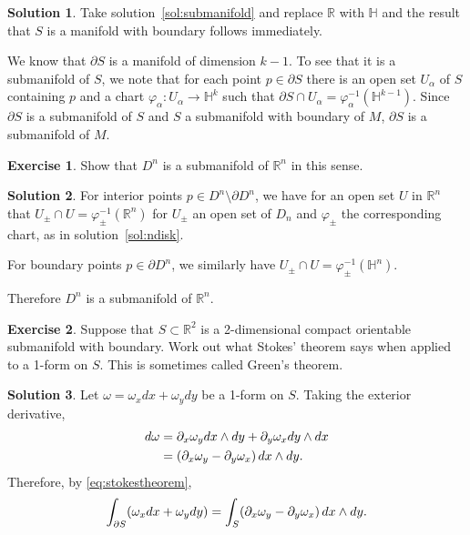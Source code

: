 \documentclass[11pt, a4paper]{report}
\theoremstyle{definition}
\newtheorem{exercise}{Exercise}[part]
\newtheorem{solution}{Solution}[part]
\newenvironment{ex}{\begin{exercise}}{\end{exercise}\pagebreak[1]}
\newenvironment{sol}{\begin{solution}}{\end{solution}\pagebreak[3]}
\newcommand*{\op}[1]{\ensuremath\mathop{}\mathopen{}#1}
\renewcommand*{\d}{\op{d}}
\begin{document}
\begin{sol}

Take solution~\ref{sol:submanifold} and replace $\mathbb{R}$ with $\mathbb{H}$ and the result that $S$ is a manifold with boundary follows immediately.

We know that $\partial S$ is a manifold of dimension $k - 1$. To see that it is a submanifold of $S$, we note that for each point $p \in \partial S$ there is an open set $U_\alpha$ of $S$ containing $p$ and a chart $\varphi_\alpha: U_\alpha \to \mathbb{H}^k$ such that $\partial S \cap U_\alpha = \varphi_\alpha^{-1}(\mathbb{H}^{k - 1})$. Since $\partial S$ is a submanifold of $S$ and $S$ a submanifold with boundary of $M$, $\partial S$ is a submanifold of $M$.

\end{sol}

\begin{ex}

Show that $D^n$ is a submanifold of $\mathbb{R}^n$ in this sense.

\end{ex}

\begin{sol}

For interior points $p \in D^n \setminus \partial D^n$, we have for an open set $U$ in $\mathbb{R}^n$ that $U_\pm \cap U = \varphi_\pm^{-1}(\mathbb{R}^n)$ for $U_\pm$ an open set of $D_n$ and $\varphi_\pm$ the corresponding chart, as in solution~\ref{sol:ndisk}.

For boundary points $p \in \partial D^n$, we similarly have $U_\pm \cap U = \varphi_\pm^{-1}(\mathbb{H}^n)$.

Therefore $D^n$ is a submanifold of $\mathbb{R}^n$.

\end{sol}

\begin{ex}

Suppose that $S \subset \mathbb{R}^2$ is a 2-dimensional compact orientable submanifold with boundary.
Work out what Stokes' theorem says when applied to a 1-form on $S$.
This is sometimes called Green's theorem.

\end{ex}

\begin{sol}

Let $\omega = \omega_x dx + \omega_y dy$ be a 1-form on $S$. Taking the exterior derivative,
\begin{align*}
    d\omega &= \partial_x \omega_y dx \wedge dy + \partial_y \omega_x dy \wedge dx \\
            &= (\partial_x \omega_y - \partial_y \omega_x) \d x \wedge dy.
\end{align*}
Therefore, by \ref{eq:stokestheorem}, %
\[
    \int_{\partial S} (\omega_x dx + \omega_y dy) =
        \int_S (\partial_x \omega_y - \partial_y \omega_x) \d x \wedge dy.
\]

\end{sol}
\end{document}
